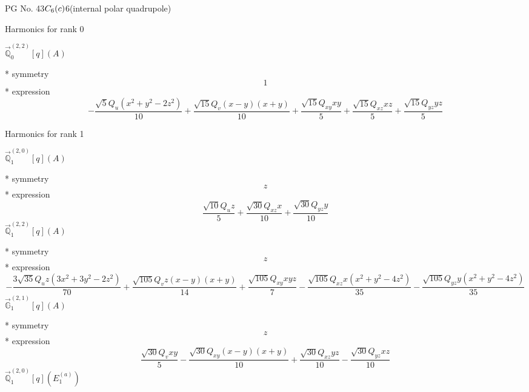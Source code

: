\documentclass[fleqn,8pt]{jsarticle}
\begin{document}
\setcounter{MaxMatrixCols}{32}

\renewcommand{\tablename}{Table~}
\renewcommand{\figurename}{Figure~}
\begin{center}
\LARGE
PG No. 43\quad$C_{\rm 6}(c)$\quad$6$\quad[ hexagonal ] (internal polar quadrupole)
\end{center}

\noindent * Harmonics for rank 0

\noindent\quad $\vec{\mathbb{Q}}_{0}^{(2,2)}[q](A)$

\noindent\quad ** symmetry
\begin{dmath*}
1
\end{dmath*}
\noindent\quad ** expression
\begin{dmath*}
- \frac{\sqrt{5} Q_{u} \left(x^{2} + y^{2} - 2 z^{2}\right)}{10} + \frac{\sqrt{15} Q_{v} \left(x - y\right) \left(x + y\right)}{10} + \frac{\sqrt{15} Q_{xy} x y}{5} + \frac{\sqrt{15} Q_{xz} x z}{5} + \frac{\sqrt{15} Q_{yz} y z}{5}
\end{dmath*}

\noindent * Harmonics for rank 1

\noindent\quad $\vec{\mathbb{Q}}_{1}^{(2,0)}[q](A)$

\noindent\quad ** symmetry
\begin{dmath*}
z
\end{dmath*}
\noindent\quad ** expression
\begin{dmath*}
\frac{\sqrt{10} Q_{u} z}{5} + \frac{\sqrt{30} Q_{xz} x}{10} + \frac{\sqrt{30} Q_{yz} y}{10}
\end{dmath*}
\noindent\quad $\vec{\mathbb{Q}}_{1}^{(2,2)}[q](A)$

\noindent\quad ** symmetry
\begin{dmath*}
z
\end{dmath*}
\noindent\quad ** expression
\begin{dmath*}
- \frac{3 \sqrt{35} Q_{u} z \left(3 x^{2} + 3 y^{2} - 2 z^{2}\right)}{70} + \frac{\sqrt{105} Q_{v} z \left(x - y\right) \left(x + y\right)}{14} + \frac{\sqrt{105} Q_{xy} x y z}{7} - \frac{\sqrt{105} Q_{xz} x \left(x^{2} + y^{2} - 4 z^{2}\right)}{35} - \frac{\sqrt{105} Q_{yz} y \left(x^{2} + y^{2} - 4 z^{2}\right)}{35}
\end{dmath*}
\noindent\quad $\vec{\mathbb{G}}_{1}^{(2,1)}[q](A)$

\noindent\quad ** symmetry
\begin{dmath*}
z
\end{dmath*}
\noindent\quad ** expression
\begin{dmath*}
\frac{\sqrt{30} Q_{v} x y}{5} - \frac{\sqrt{30} Q_{xy} \left(x - y\right) \left(x + y\right)}{10} + \frac{\sqrt{30} Q_{xz} y z}{10} - \frac{\sqrt{30} Q_{yz} x z}{10}
\end{dmath*}
\noindent\quad $\vec{\mathbb{Q}}_{1}^{(2,0)}[q](E_{1}^{(a)})$
\end{document}
